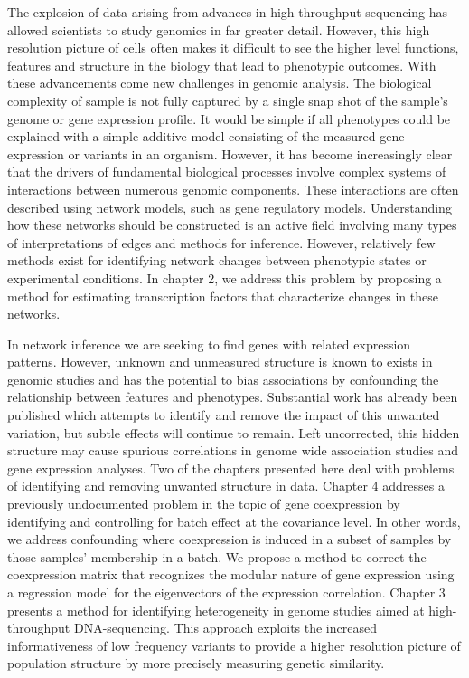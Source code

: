 
The explosion of data arising from advances in high throughput sequencing has allowed scientists to study genomics in far greater detail.  However, this high resolution picture of cells often makes it difficult to see the higher level functions, features and structure in the biology that lead to phenotypic outcomes.  With these advancements come new challenges in genomic analysis. The biological complexity of sample is not fully captured by a single snap shot of the sample's genome or gene expression profile. It would be simple if all phenotypes could be explained with a simple additive model consisting of the measured gene expression or variants in an organism.  However, it has become increasingly clear that the drivers of fundamental biological processes involve complex systems of interactions between numerous genomic components.  These interactions are often described using network models, such as gene regulatory models.  Understanding how these networks should be constructed is an active field involving many types of interpretations of edges and methods for inference. However, relatively few methods exist for identifying network changes between phenotypic states or experimental conditions.  In chapter 2, we address this problem by proposing a method for estimating transcription factors that characterize changes in these networks.

In network inference we are seeking to find genes with related expression patterns. However, unknown and unmeasured structure is known to exists in genomic studies and has the potential to bias associations by confounding the relationship between features and phenotypes. Substantial work has already been published which attempts to identify and remove the impact of this unwanted variation, but subtle effects will continue to remain. Left uncorrected, this hidden structure may cause spurious correlations in genome wide association studies and gene expression analyses.  Two of the chapters presented here deal with problems of identifying and removing unwanted structure in data. Chapter 4 addresses a previously undocumented problem in the topic of gene coexpression by identifying and controlling for batch effect at the covariance level. In other words, we address confounding where coexpression is induced in a subset of samples by those samples' membership in a batch. We propose a method to correct the coexpression matrix that recognizes the modular nature of gene expression using a regression model for the eigenvectors of the expression correlation. Chapter 3 presents a method for identifying heterogeneity in genome studies aimed at high-throughput DNA-sequencing. This approach exploits the increased informativeness of low frequency variants to provide a higher resolution picture of population structure by more precisely measuring genetic similarity.